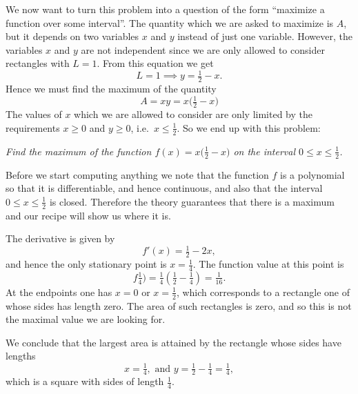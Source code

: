 We now want to turn this problem into a question of the form ``maximize a
function over some interval''.  The quantity which we are asked to maximize is
$A$, but it depends on two variables $x$ and $y$ instead of just one variable.
However, the variables $x$ and $y$ are not independent since we are only allowed
to consider rectangles with $L=1$.  From this equation we get
\[
L=1\implies y = \tfrac12-x.
\]
Hence we must find the maximum of the quantity
\[
A= xy = x\bigl(\tfrac12-x\bigr)
\]
The values of $x$ which we are allowed to consider are only limited by
the requirements $x\geq 0$ and $y\geq0$, i.e.\ $x\leq \tfrac12$.  So
we end up with this problem:
\begin{center}
  \textit{Find the maximum of the function
    $f(x)=x\bigl(\tfrac12-x\bigr)$ on the interval $0\leq x\leq
    \tfrac12$.}
\end{center}
Before we start computing anything we note that the function $f$ is a
polynomial so that it is differentiable, and hence continuous, and
also that the interval $0\leq x\leq\tfrac12$ is closed.  Therefore the
theory guarantees that there is a maximum and our recipe will show us
where it is.

The derivative is given by
\[
f'(x) = \tfrac12 - 2x,
\]
and hence the only stationary point is \( x=\tfrac14 \).  The function value at
this point is
\[
f\tfrac14) = \tfrac14(\tfrac12-\tfrac14) = \tfrac1{16}.
\]
At the endpoints one has $x=0$ or $x=\tfrac12$, which corresponds to a rectangle
one of whose sides has length zero.  The area of such rectangles is zero, and so
this is not the maximal value we are looking for.

We conclude that the largest area is attained by the rectangle whose sides have
lengths
\[
x=\tfrac14, \text{ and }y= \tfrac12-\tfrac14 = \tfrac14,
\]
which is a square with sides of length $\tfrac14$.



